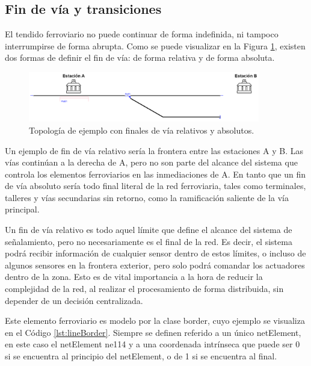 \subsection{Fin de vía y transiciones}
    \label{sec:bufferstop}

    El tendido ferroviario no puede continuar de forma indefinida, ni tampoco interrumpirse de forma abrupta. Como se puede visualizar en la Figura \ref{fig:frontera_1}, existen dos formas de definir el fin de vía: de forma relativa y de forma absoluta.

    \begin{figure}[H]
        \centering
        \includegraphics[width=0.9\textwidth]{Figuras/Border.png}
        \centering\caption{Topología de ejemplo con finales de vía relativos y absolutos.}
        \label{fig:frontera_1}
    \end{figure}

    Un ejemplo de fin de vía relativo sería la frontera entre las estaciones A y B. Las vías continúan a la derecha de A, pero no son parte del alcance del sistema que controla los elementos ferroviarios en las inmediaciones de A. En tanto que un fin de vía absoluto sería todo final literal de la red ferroviaria, tales como terminales, talleres y vías secundarias sin retorno, como la ramificación saliente de la vía principal.
    
    Un fin de vía relativo es todo aquel límite que define el alcance del sistema de señalamiento, pero no necesariamente es el final de la red. Es decir, el sistema podrá recibir información de cualquier sensor dentro de estos límites, o incluso de algunos sensores en la frontera exterior, pero solo podrá comandar los actuadores dentro de la zona. Esto es de vital importancia a la hora de reducir la complejidad de la red, al realizar el procesamiento de forma distribuida, sin depender de un decisión centralizada.

    Este elemento ferroviario es modelo por la clase border, cuyo ejemplo se visualiza en el Código \ref{lst:lineBorder}. Siempre se definen referido a un único netElement, en este caso el netElement ne114 y a una coordenada intrínseca que puede ser 0 si se encuentra al principio del netElement, o de 1 si se encuentra al final.

